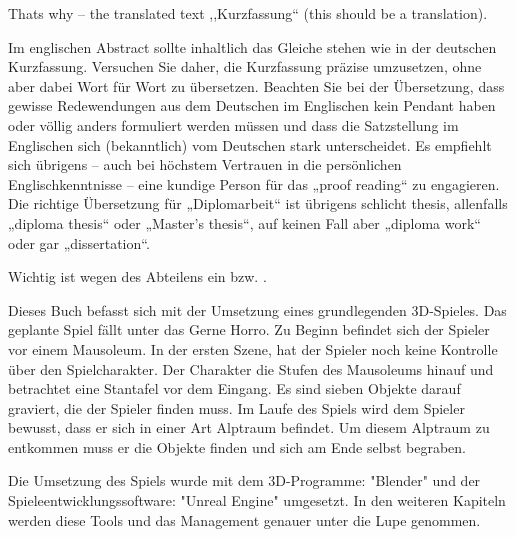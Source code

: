 
Thats why -- the translated text ,,Kurzfassung`` (this should be
a translation).

Im englischen Abstract sollte inhaltlich das Gleiche stehen wie in
der deutschen Kurzfassung. Versuchen Sie daher, die Kurzfassung präzise
umzusetzen, ohne aber dabei Wort für Wort zu übersetzen. Beachten
Sie bei der Übersetzung, dass gewisse Redewendungen aus dem Deutschen
im Englischen kein Pendant haben oder völlig anders formuliert werden
müssen und dass die Satzstellung im Englischen sich (bekanntlich)
vom Deutschen stark unterscheidet. Es empfiehlt sich übrigens – auch
bei höchstem Vertrauen in die persönlichen Englischkenntnisse – eine
kundige Person für das „proof reading“ zu engagieren. Die richtige
Übersetzung für „Diplomarbeit“ ist übrigens schlicht thesis, allenfalls
„diploma thesis“ oder „Master’s thesis“, auf keinen Fall aber „diploma
work“ oder gar „dissertation“\citep{hagenberg}.

Wichtig ist wegen des Abteilens ein 
bzw. .

Dieses Buch befasst sich mit der Umsetzung eines grundlegenden 3D-Spieles. Das geplante Spiel fällt unter das Gerne Horro.
Zu Beginn befindet sich der Spieler vor einem Mausoleum. In der ersten Szene, hat der Spieler noch keine Kontrolle über den Spielcharakter.
Der Charakter die Stufen des Mausoleums hinauf und betrachtet eine Stantafel vor dem Eingang. Es sind sieben Objekte darauf graviert, die der Spieler finden muss.
Im Laufe des Spiels wird dem Spieler bewusst, dass er sich in einer Art Alptraum befindet. Um diesem Alptraum zu entkommen muss er die Objekte finden und sich am Ende selbst begraben.

Die Umsetzung des Spiels wurde mit dem 3D-Programme: "Blender" und der Spieleentwicklungssoftware: "Unreal Engine" umgesetzt.
In den weiteren Kapiteln werden diese Tools und das Management genauer unter die Lupe genommen.

